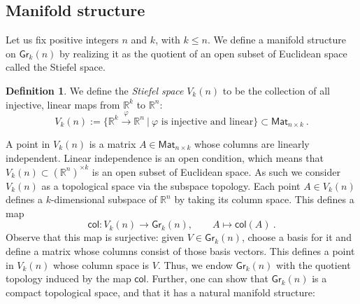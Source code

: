 \documentclass{article}
\newcommand{\bb}[1]{\mathbb{#1}}
\newcommand{\msf}[1]{\mathsf{#1}}
\newcommand{\gr}{\msf{Gr}}
\newcommand{\mat}{\msf{Mat}}
\newcommand{\col}{\msf{col}}
\theoremstyle{definition}
\newtheorem{definition}[theorem]{Definition}
\begin{document}
\subsection{Manifold structure}\label{mfld}
Let us fix positive integers $n$ and $k$, with $k \le n$. We define a manifold structure on $\gr_k(n)$ by 
realizing it as the quotient of an open subset of Euclidean space called the Stiefel space.

\begin{definition}
    We define the \emph{Stiefel space} $V_k(n)$ to be the collection of all injective, linear maps 
    from $\bb{R}^k$ to $\bb{R}^n$:
    $$V_k(n) := \{\bb{R}^k \xrightarrow{\varphi} \bb{R}^n ~|~ \varphi \text{ is injective and linear}\} \subset
        \mat_{n \times k}~.$$
\end{definition}

A point in $V_k(n)$ is a matrix $A \in \mat_{n \times k}$ whose columns are linearly independent.
Linear independence is an open condition, which means that $V_k(n) \subset (\bb{R}^n)^{\times k}$ is an
open subset of Euclidean space. As such we consider $V_k(n)$ as a topological space via the subspace topology.
Each point $A \in V_k(n)$ 
defines a $k$-dimensional subspace of $\bb{R}^n$ by taking its column space. 
This defines a map
$$\col : V_k(n) \to \gr_k(n), \qquad A \mapsto \col(A)~.$$
Observe that this map is surjective: given $V \in \gr_k(n)$, choose a basis for it and define a matrix whose columns
consist of those basis vectors. This defines a point in $V_k(n)$ whose column space is $V$.
Thus, we endow $\gr_k(n)$ with the quotient topology induced by the map $\col$. 
Further, one can show that $\gr_k(n)$ is a compact topological space, and that it has a natural manifold structure:
\end{document}
